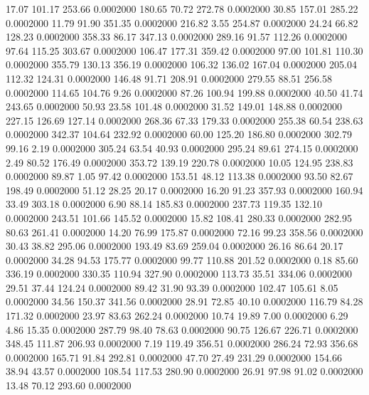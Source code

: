   17.07  101.17  253.66   0.0002000
 180.65   70.72  272.78   0.0002000
  30.85  157.01  285.22   0.0002000
  11.79   91.90  351.35   0.0002000
 216.82    3.55  254.87   0.0002000
  24.24   66.82  128.23   0.0002000
 358.33   86.17  347.13   0.0002000
 289.16   91.57  112.26   0.0002000
  97.64  115.25  303.67   0.0002000
 106.47  177.31  359.42   0.0002000
  97.00  101.81  110.30   0.0002000
 355.79  130.13  356.19   0.0002000
 106.32  136.02  167.04   0.0002000
 205.04  112.32  124.31   0.0002000
 146.48   91.71  208.91   0.0002000
 279.55   88.51  256.58   0.0002000
 114.65  104.76    9.26   0.0002000
  87.26  100.94  199.88   0.0002000
  40.50   41.74  243.65   0.0002000
  50.93   23.58  101.48   0.0002000
  31.52  149.01  148.88   0.0002000
 227.15  126.69  127.14   0.0002000
 268.36   67.33  179.33   0.0002000
 255.38   60.54  238.63   0.0002000
 342.37  104.64  232.92   0.0002000
  60.00  125.20  186.80   0.0002000
 302.79   99.16    2.19   0.0002000
 305.24   63.54   40.93   0.0002000
 295.24   89.61  274.15   0.0002000
   2.49   80.52  176.49   0.0002000
 353.72  139.19  220.78   0.0002000
  10.05  124.95  238.83   0.0002000
  89.87    1.05   97.42   0.0002000
 153.51   48.12  113.38   0.0002000
  93.50   82.67  198.49   0.0002000
  51.12   28.25   20.17   0.0002000
  16.20   91.23  357.93   0.0002000
 160.94   33.49  303.18   0.0002000
   6.90   88.14  185.83   0.0002000
 237.73  119.35  132.10   0.0002000
 243.51  101.66  145.52   0.0002000
  15.82  108.41  280.33   0.0002000
 282.95   80.63  261.41   0.0002000
  14.20   76.99  175.87   0.0002000
  72.16   99.23  358.56   0.0002000
  30.43   38.82  295.06   0.0002000
 193.49   83.69  259.04   0.0002000
  26.16   86.64   20.17   0.0002000
  34.28   94.53  175.77   0.0002000
  99.77  110.88  201.52   0.0002000
   0.18   85.60  336.19   0.0002000
 330.35  110.94  327.90   0.0002000
 113.73   35.51  334.06   0.0002000
  29.51   37.44  124.24   0.0002000
  89.42   31.90   93.39   0.0002000
 102.47  105.61    8.05   0.0002000
  34.56  150.37  341.56   0.0002000
  28.91   72.85   40.10   0.0002000
 116.79   84.28  171.32   0.0002000
  23.97   83.63  262.24   0.0002000
  10.74   19.89    7.00   0.0002000
   6.29    4.86   15.35   0.0002000
 287.79   98.40   78.63   0.0002000
  90.75  126.67  226.71   0.0002000
 348.45  111.87  206.93   0.0002000
   7.19  119.49  356.51   0.0002000
 286.24   72.93  356.68   0.0002000
 165.71   91.84  292.81   0.0002000
  47.70   27.49  231.29   0.0002000
 154.66   38.94   43.57   0.0002000
 108.54  117.53  280.90   0.0002000
  26.91   97.98   91.02   0.0002000
  13.48   70.12  293.60   0.0002000

